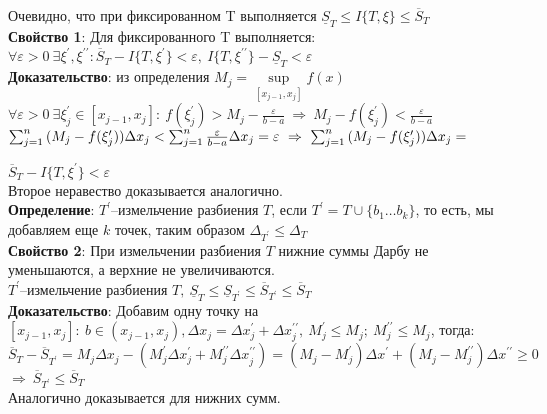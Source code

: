 \documentclass[a4paper,12pt]{article} %
\begin{document}
\noindent Очевидно, что при фиксированном T выполняется $\underline{S}_T \leq  I\{T,\xi\} \leq \overline{S}_T$\\

\noindent \textbf{Свойство 1}: Для фиксированного T выполняется:\\
$\forall\varepsilon>0~\exists \xi^{\prime}, \xi^{\prime \prime}: \overline{S}_T - I\{T,\xi^{\prime}\}<\varepsilon,~I\{T,\xi^{\prime\prime}\}-\underline{S}_T<\varepsilon$\\
\noindent \textbf{Доказательство}: из определения $M_j = \sup\limits_{[x_{j-1},x_j]}f(x)$\\
$\forall\varepsilon>0~\exists \xi^{\prime}_j \in [x_{j-1},x_j]:~f(\xi^{\prime}_j)>M_j-\frac{\varepsilon}{b-a}~\Rightarrow~M_j-f(\xi^{\prime}_j)<\frac{\varepsilon}{b-a}$\\

\noindent$\sum_{j = 1}^{n} {(M_j-f(\xi^{\prime}_j))\Delta x_j}<\sum_{j = 1}^{n} {\frac{\varepsilon}{b-a}\Delta x_j} = \varepsilon~\Rightarrow~\sum_{j = 1}^{n} {(M_j-f(\xi^{\prime}_j))\Delta x_j}=\\$

\noindent$\overline{S}_T - I\{T,\xi^{\prime}\}<\varepsilon$ \\
Второе неравество доказывается аналогично.\\

\noindent \textbf{Определение}: $T^{\prime}$--измельчение разбиения $T$, если $T^{\prime}=T\cup \{b_1{\dots}b_k\}$, то есть, мы добавляем еще $k$ точек, таким образом $\Delta_{T^{\prime}}\leq \Delta_T$\\

\noindent \textbf{Свойство 2}: При измельчении разбиения $T$ нижние суммы Дарбу не уменьшаются, а верхние не увеличиваются.\\
$T^{\prime}$--измельчение разбиения $T,~\underline{S}_T\leq \underline{S}_{T^{\prime}}\leq \overline{S}_{T^{\prime}}\leq \overline{S}_T$\\
\noindent \textbf{Доказательство}: Добавим одну точку на $[x_{j-1},x_j]:~b\in (x_{j-1},x_j), \Delta x_j = \Delta x^{\prime}_j +\Delta x^{\prime\prime}_j,~M^{\prime}_j\leq M_j;~M^{\prime\prime}_j\leq M_j$, тогда:\\
$$\overline{S}_T-\overline{S}_{T^{\prime}}=M_j\Delta x_j-(M^{\prime}_j\Delta x^{\prime}_j+M^{\prime\prime}_j\Delta x^{\prime\prime}_j)=(M_j-M^{\prime}_j)\Delta x^{\prime}+(M_j-M^{\prime\prime}_j)\Delta x^{\prime\prime}\geq0$$
$\Rightarrow~\overline{S}_{T^{\prime}}\leq \overline{S}_T$\\
Аналогично доказывается для нижних сумм.\\
\end{document}
